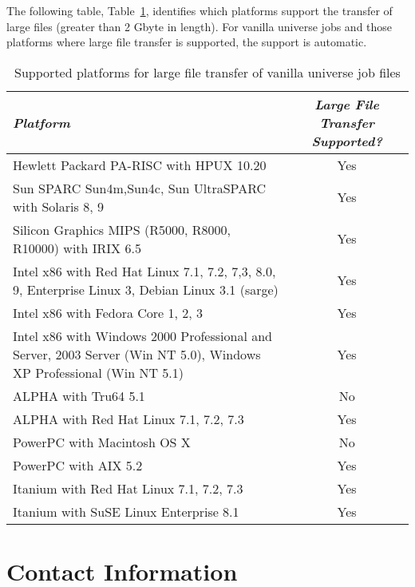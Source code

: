 The following table, 
Table~\ref{large-file-support},
identifies which platforms support
the transfer of large files (greater than 2 Gbyte in length).
For vanilla universe jobs and those platforms where large file transfer is
supported, the support is automatic.

\begin{center}
\begin{table}[hbt]
\begin{tabular}{|lc|} \hline
\emph{Platform} & \emph{Large File Transfer Supported?} \\ \hline \hline
Hewlett Packard PA-RISC with HPUX 10.20 & Yes \\ \hline
Sun SPARC Sun4m,Sun4c, Sun UltraSPARC with Solaris 8, 9 & Yes \\ \hline
Silicon Graphics MIPS (R5000, R8000, R10000) with IRIX 6.5 &  Yes \\ \hline
Intel x86 with Red Hat Linux 7.1, 7.2, 7,3, 8.0, 9, Enterprise Linux 3, Debian Linux 3.1 (sarge) & Yes \\ 
Intel x86 with Fedora Core 1, 2, 3 & Yes \\
Intel x86 with Windows 2000 Professional and Server, 2003 Server (Win NT 5.0), Windows XP Professional (Win NT 5.1) & Yes \\ \hline
ALPHA with  Tru64 5.1  & No \\ 
ALPHA with Red Hat Linux 7.1, 7.2, 7.3 & Yes \\ \hline
PowerPC with Macintosh OS X  & No \\
PowerPC with AIX 5.2  & Yes \\ \hline
Itanium with Red Hat Linux 7.1, 7.2, 7.3 & Yes \\
Itanium with SuSE Linux Enterprise 8.1 & Yes \\ \hline
\end{tabular}
\caption{\label{large-file-support}Supported platforms for large file transfer of vanilla universe job files}
\end{table}
\end{center}


 


\section{\label{contact-info}Contact Information}


